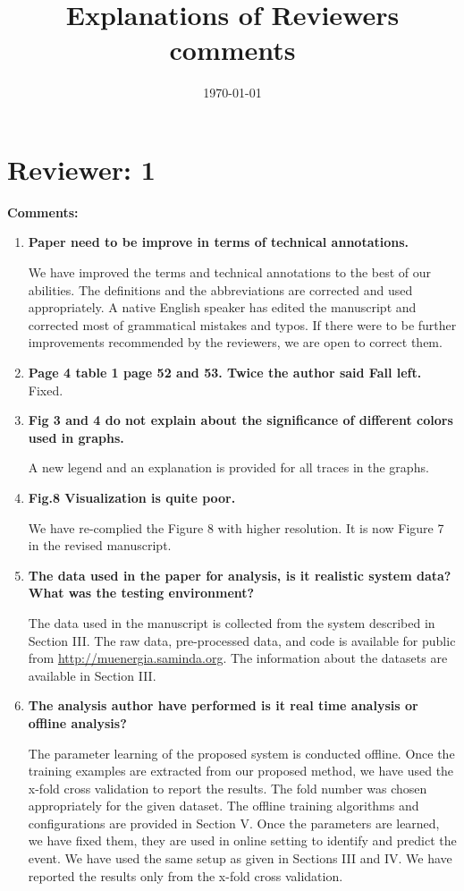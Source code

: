 \documentclass[12pt]{article}
\title{Explanations of Reviewers comments}
\date{\today}
\begin{document}
\maketitle

\section*{Reviewer: 1}


\textbf{Comments:}

\begin{enumerate}

\item \textbf{Paper need to be improve in terms of technical annotations.}

We have improved the terms and technical annotations to the best of our abilities. The 
definitions and the abbreviations are corrected and used appropriately.  A native 
English 
speaker has edited the manuscript and corrected most of grammatical mistakes and typos.  
If there 
were to be further improvements recommended by the reviewers, we are open to correct 
them. 

\item \textbf{Page 4 table 1 page 52 and 53. Twice the author said Fall left.}
Fixed.

\item \textbf{Fig 3 and 4 do not explain about the significance of different colors used 
in 
graphs.}

A new legend and an explanation is provided for all traces in the graphs. 

\item \textbf{Fig.8 Visualization is quite poor.}

We have re-complied the Figure 8 with higher resolution. It is now Figure 7 in the 
revised manuscript.   

\item \textbf{The data used in the paper for analysis, is it realistic system data? What 
was the testing environment?}

The data used in the manuscript is collected from the system described in Section III. 
The 
raw data, pre-processed data, and code is available for public from 
\url{http://muenergia.saminda.org}. The information about the datasets are available in 
Section III. 

\item \textbf{The analysis author have performed is it real time analysis or offline 
analysis?}

The parameter learning of the proposed system is conducted offline. Once the training 
examples are extracted from our proposed method, we have used the x-fold cross validation 
to report the results. The fold number was chosen appropriately for the given dataset. 
The offline training algorithms and configurations are provided in Section V. Once the 
parameters are learned, we have fixed them, they are used in online setting to identify 
and predict the event. We have used the same setup as given in Sections III and IV. We 
have reported the results only from the x-fold cross validation.  

\end{enumerate}
\end{document}
